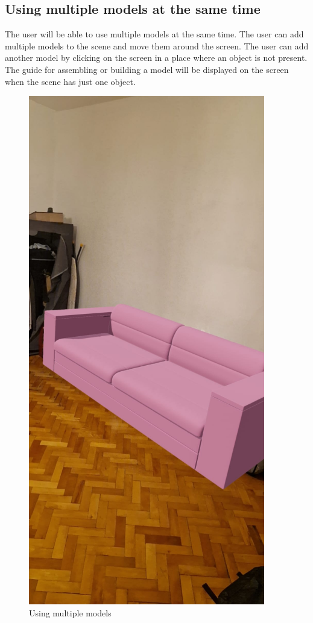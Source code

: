 \subsection{Using multiple models at the same time}
The user will be able to use multiple models at the same time. The user can add multiple models to the scene and move them around the screen. The user can add another model by clicking on the screen in a place where an object is not present. The guide for assembling or building a model will be displayed on the screen when the scene has just one object.
\begin{figure}[h!]
    \begin{center}
        \includegraphics[scale=0.5]{img/App_mock/iPhone 14 - 11.png}
        \caption{Using multiple models}
        \label{fig:using-multiple-models}
    \end{center}
\end{figure}
\pagebreak
